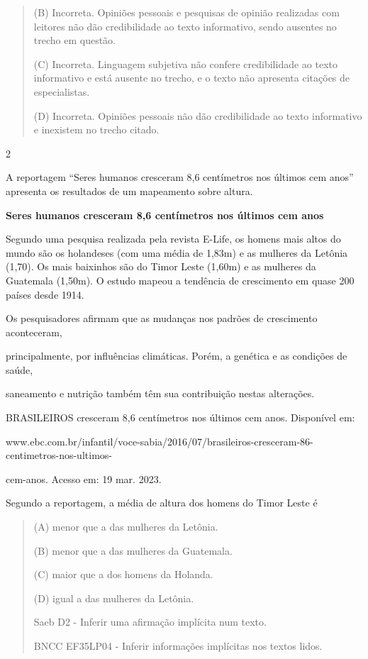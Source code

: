\begin{escolha}
\begin{quote}
(B) Incorreta. Opiniões pessoais e pesquisas de opinião realizadas com
leitores não dão credibilidade ao texto informativo, sendo ausentes no
trecho em questão.

(C) Incorreta. Linguagem subjetiva não confere credibilidade ao texto
informativo e está ausente no trecho, e o texto não apresenta citações
de especialistas.

(D) Incorreta. Opiniões pessoais não dão credibilidade ao texto
informativo e inexistem no trecho citado.
\end{quote}

\num{2}

A reportagem ``Seres humanos cresceram 8,6 centímetros nos últimos cem
anos'' apresenta os resultados de um mapeamento sobre altura.

\textbf{Seres humanos cresceram 8,6 centímetros nos últimos cem anos}

Segundo uma pesquisa realizada pela revista E-Life, os homens mais altos
do mundo são os holandeses (com uma média de 1,83m) e as mulheres da
Letônia (1,70). Os mais baixinhos são do Timor Leste (1,60m) e as
mulheres da Guatemala (1,50m). O estudo mapeou a tendência de
crescimento em quase 200 países desde 1914.

Os pesquisadores afirmam que as mudanças nos padrões de crescimento
aconteceram,

principalmente, por influências climáticas. Porém, a genética e as
condições de saúde,

saneamento e nutrição também têm sua contribuição nestas alterações.

BRASILEIROS cresceram 8,6 centímetros nos últimos cem anos. Disponível
em:

www.ebc.com.br/infantil/voce-sabia/2016/07/brasileiros-cresceram-86-centimetros-nos-ultimos-

cem-anos. Acesso em: 19 mar. 2023.

Segundo a reportagem, a média de altura dos homens do Timor Leste é

\begin{quote}
(A) menor que a das mulheres da Letônia.

(B) menor que a das mulheres da Guatemala.

(C) maior que a dos homens da Holanda.

(D) igual a das mulheres da Letônia.

Saeb D2 - Inferir uma afirmação implícita num texto.

BNCC EF35LP04 - Inferir informações implícitas nos textos lidos.


\end{quote}
\end{escolha}
